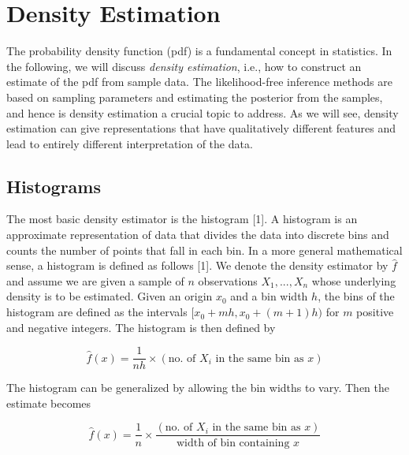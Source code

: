 \chapter{Density Estimation}\label{chap:dens_est}

The probability density function (pdf) is a fundamental concept in statistics. In the following, we will discuss \textit{density estimation}, i.e., how to construct an estimate of the pdf from sample data. The likelihood-free inference methods are based on sampling parameters and estimating the posterior from the samples, and hence is density estimation a crucial topic to address. As we will see, density estimation can give representations that have qualitatively different features and lead to entirely different interpretation of the data. 

\section{Histograms}\label{sec:histograms}

The most basic density estimator is the histogram [1]. A histogram is an approximate representation of data that divides the data into discrete bins and counts the number of points that fall in each bin. In a more general mathematical sense, a histogram is defined as follows [1]. We denote the density estimator by $\hat{f}$ and assume we are given a sample of $n$ observations $X_1, ..., X_n$ whose underlying density is to be estimated. Given an origin $x_0$ and a bin width $h$, the bins of the histogram are defined as the intervals $[x_0 + mh, x_0 + (m+1)h)$ for $m$ positive and negative integers. The histogram is then defined by

\begin{equation*}
    \hat{f}(x) = \frac{1}{nh} \times (\text{no. of } X_i \text{ in the same bin as } x)
\end{equation*}

The histogram can be generalized by allowing the bin widths to vary. Then the estimate becomes 

\begin{equation*}
    \hat{f}(x) = \frac{1}{n} \times \frac{(\text{no. of } X_i \text{ in the same bin as } x)}{\text{width of bin containing }x}
\end{equation*}

